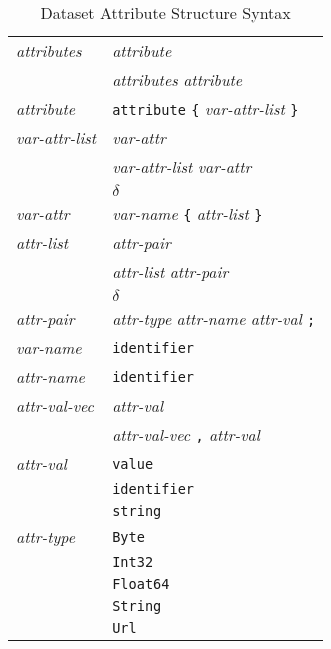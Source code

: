\begin{table}
\caption{Dataset Attribute Structure Syntax}
\label{tab:DAS}
\small
\begin{center}
\begin{tabular}{ll} \hline
{\em attributes\/} & {\em attribute\/} \\
                 & {\em attributes} {\em attribute\/} \\

{\em attribute\/} & {\tt attribute} {\tt \{} {\em var-attr-list\/} {\tt \}} \\

{\em var-attr-list\/} & {\em var-attr\/} \\
                 & {\em var-attr-list} {\em var-attr\/} \\
                 & $\delta$ \\

{\em var-attr\/} & {\em var-name} 
                {\tt \{} {\em attr-list\/} {\tt \}} \\

{\em attr-list\/} & {\em attr-pair\/} \\
                &  {\em attr-list} {\em attr-pair\/} \\
                & $\delta$ \\

{\em attr-pair\/} & {\em attr-type} {\em attr-name} {\em attr-val\/} 
                {\tt ;} \\

{\em var-name\/} & {\tt identifier} \\

{\em attr-name\/} & {\tt identifier} \\

{\em attr-val-vec\/} & {\em attr-val\/} \\
                     & {\em attr-val-vec\/} {\tt ,} {\em attr-val\/} \\

{\em attr-val\/} & {\tt value} \\
                 & {\tt identifier} \\
                 & {\tt string} \\

{\em attr-type\/} & {\tt Byte} \\
                  & {\tt Int32} \\
                  & {\tt Float64} \\
                  & {\tt String} \\
                  & {\tt Url} \\

\end{tabular}
\end{center}
\normalsize
\end{table}

